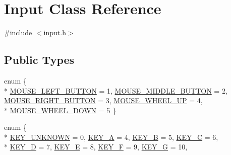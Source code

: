\hypertarget{class_input}{}\section{Input Class Reference}
\label{class_input}


{\ttfamily \#include $<$input.\+h$>$}

\subsection*{Public Types}
\begin{DoxyCompactItemize}
\item 
enum \{ \\*
\hyperlink{class_input_aea68a84e0161c3529415c3b868c513dea96ef1596508d237f71489ad19d5eec5a}{M\+O\+U\+S\+E\+\_\+\+L\+E\+F\+T\+\_\+\+B\+U\+T\+T\+O\+N} = 1, 
\hyperlink{class_input_aea68a84e0161c3529415c3b868c513dea98e03b1d8ffff84d003c720a763aa4d1}{M\+O\+U\+S\+E\+\_\+\+M\+I\+D\+D\+L\+E\+\_\+\+B\+U\+T\+T\+O\+N} = 2, 
\hyperlink{class_input_aea68a84e0161c3529415c3b868c513dea5922e55184cda10f884d2033904b7556}{M\+O\+U\+S\+E\+\_\+\+R\+I\+G\+H\+T\+\_\+\+B\+U\+T\+T\+O\+N} = 3, 
\hyperlink{class_input_aea68a84e0161c3529415c3b868c513deaeb908985c36b0eeaab5772810b714391}{M\+O\+U\+S\+E\+\_\+\+W\+H\+E\+E\+L\+\_\+\+U\+P} = 4, 
\\*
\hyperlink{class_input_aea68a84e0161c3529415c3b868c513deafe1cb0a5d40b7fbb03ed5efa0497eae1}{M\+O\+U\+S\+E\+\_\+\+W\+H\+E\+E\+L\+\_\+\+D\+O\+W\+N} = 5
 \}
\item 
enum \{ \\*
\hyperlink{class_input_a4f2253b072b4ee76f282f670de5743ebac94427054d58a64942c42e8fd9f39c4a}{K\+E\+Y\+\_\+\+U\+N\+K\+N\+O\+W\+N} = 0, 
\hyperlink{class_input_a4f2253b072b4ee76f282f670de5743ebaf1e065a96eabf0f4d2ef4c7e0c12e341}{K\+E\+Y\+\_\+\+A} = 4, 
\hyperlink{class_input_a4f2253b072b4ee76f282f670de5743eba57b284b59c51944ef7aecd04329b7208}{K\+E\+Y\+\_\+\+B} = 5, 
\hyperlink{class_input_a4f2253b072b4ee76f282f670de5743eba592bcff7310b4d3deea580d71f2b4d9d}{K\+E\+Y\+\_\+\+C} = 6, 
\\*
\hyperlink{class_input_a4f2253b072b4ee76f282f670de5743eba7faaaac34ba3a674359507db90358947}{K\+E\+Y\+\_\+\+D} = 7, 
\hyperlink{class_input_a4f2253b072b4ee76f282f670de5743ebae58f1491f2b050638699626d923749c5}{K\+E\+Y\+\_\+\+E} = 8, 
\hyperlink{class_input_a4f2253b072b4ee76f282f670de5743ebaf100d85db46aca1bab70cf62fd338a19}{K\+E\+Y\+\_\+\+F} = 9, 
\hyperlink{class_input_a4f2253b072b4ee76f282f670de5743eba71605f48a9a1f07a7fe3cdee1a358e80}{K\+E\+Y\+\_\+\+G} = 10, 

\end{DoxyCompactItemize}
